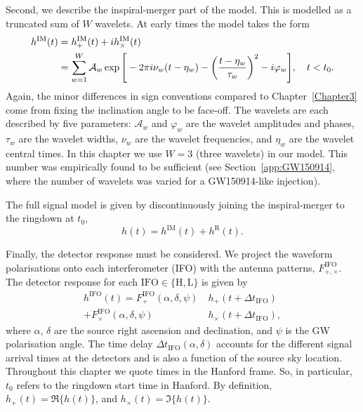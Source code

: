 Second, we describe the inspiral-merger part of the model.
This is modelled as a truncated sum of $W$ wavelets.
At early times the model takes the form
\begin{align}\label{eq:wavelets}
	h^\mathrm{IM}(t) &=  h_+^\mathrm{IM}(t) + ih_\times^\mathrm{IM}(t) \nonumber \\
	&= \sum_{w=1}^{W} \mathcal{A}_w \exp \Bigg[-2\pi i \nu_w(t-\eta_w) - \qty(\frac{t-\eta_w}{\tau_w})^2 - i\varphi_w \Bigg], \quad t < t_0. 
\end{align}
Again, the minor differences in sign conventions compared to Chapter~\ref{Chapter3} come from fixing the inclination angle to be face-off. 
The wavelets are each described by five parameters: $\mathcal{A}_w$ and $\varphi_w$ are the wavelet amplitudes and phases, $\tau_w$ are the wavelet widths, $\nu_w$ are the wavelet frequencies, and $\eta_w$ are the wavelet central times. 
In this chapter we use $W=3$ (three wavelets) in our model.
This number was empirically found to be sufficient (see Section~\ref{app:GW150914}, where the number of wavelets was varied for a GW150914-like injection).

The full signal model is given by discontinuously joining the inspiral-merger to the ringdown at $t_0$,
\begin{equation}
	h(t) = h^\mathrm{IM}(t) + h^\mathrm{R}(t).
\end{equation}

Finally, the detector response must be considered.
We project the waveform polarisations onto each interferometer (IFO) with the antenna patterns, $F^\mathrm{IFO}_{+,\times}$.
The detector response for each ${\mathrm{IFO}\in \{\mathrm{H}, \mathrm{L}\}}$ is given by
\begin{align} \label{ch4:eq:projection_antenna}
	h^\mathrm{IFO}(t) = F^\mathrm{IFO}_+(\alpha, \delta, \psi) ~ &h_+(t + \Delta t_\mathrm{IFO}) \nonumber \\
	+ F^\mathrm{IFO}_\times(\alpha, \delta, \psi) ~ &h_\times(t + \Delta t_\mathrm{IFO}),
\end{align}
where $\alpha$, $\delta$ are the source right ascension and declination, and $\psi$ is the GW polarisation angle.
The time delay $\Delta t_\mathrm{IFO}(\alpha, \delta)$ accounts for the different signal arrival times at the detectors and is also a function of the source sky location.
Throughout this chapter we quote times in the Hanford frame.
So, in particular, $t_0$ refers to the ringdown start time in Hanford.
By definition, $h_+(t) = \Re\{ h(t) \}$, and $h_\times(t) = \Im \{ h(t) \}$.


